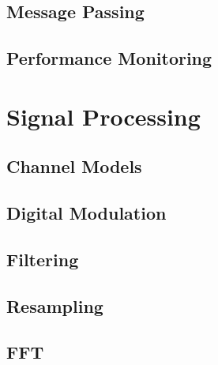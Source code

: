 \documentclass[10pt]{article}
\begin{document}
\begin{multicols*}{3}
\subsection{Message Passing}

\subsection{Performance Monitoring}

\section{Signal Processing}

\subsection{Channel Models}

\subsection{Digital Modulation}

\subsection{Filtering}

\subsection{Resampling}

\subsection{FFT}

\end{multicols*}
\end{document}
